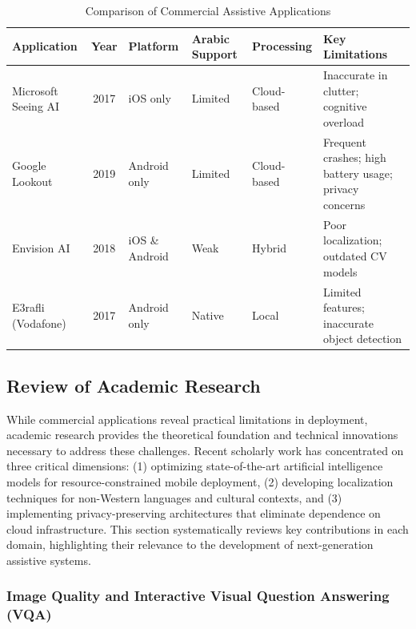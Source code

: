 \documentclass[a4paper]{report}
\begin{document}
\begin{table}[H]
\centering
\caption{Comparison of Commercial Assistive Applications}
\label{tab:app-comparison}
\small
\begin{tabular}{@{}p{2.8cm}cp{2.2cm}p{2.2cm}p{2cm}p{3.5cm}@{}}
\toprule
\textbf{Application} & \textbf{Year} & \textbf{Platform} & \textbf{Arabic Support} & \textbf{Processing} & \textbf{Key Limitations} \\
\midrule
Microsoft Seeing AI \cite{microsoft_seeingai} & 2017 & iOS only & Limited & Cloud-based & Inaccurate in clutter; cognitive overload \\
\midrule
Google Lookout \cite{google_lookout} & 2019 & Android only & Limited & Cloud-based & Frequent crashes; high battery usage; privacy concerns \\
\midrule
Envision AI \cite{envision_ai} & 2018 & iOS \& Android & Weak & Hybrid & Poor localization; outdated CV models \\
\midrule
E3rafli (Vodafone) \cite{vodafone_e3rafli} & 2017 & Android only & Native & Local & Limited features; inaccurate object detection \\
\bottomrule
\end{tabular}
\end{table}

\subsection{Review of Academic Research}
\label{subsec:academic-research}

While commercial applications reveal practical limitations in deployment, academic research provides the theoretical foundation and technical innovations necessary to address these challenges. Recent scholarly work has concentrated on three critical dimensions: (1) optimizing state-of-the-art artificial intelligence models for resource-constrained mobile deployment, (2) developing localization techniques for non-Western languages and cultural contexts, and (3) implementing privacy-preserving architectures that eliminate dependence on cloud infrastructure. This section systematically reviews key contributions in each domain, highlighting their relevance to the development of next-generation assistive systems.

\subsubsection{Image Quality and Interactive Visual Question Answering (VQA)}
\end{document}
